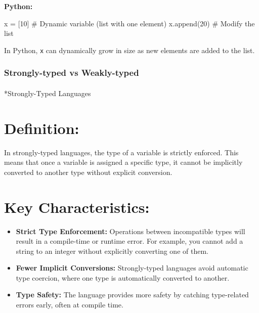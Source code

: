 \documentclass[
  letterpaper,
  DIV=11,
  numbers=noendperiod]{scrreprt}
\makeatletter
\let\oldparagraph\paragraph
\renewcommand{\paragraph}{
    \@ifstar
      \xxxParagraphStar
      \xxxParagraphNoStar
  }
\newcommand{\xxxParagraphStar}[1]{\oldparagraph*{#1}\mbox{}}
\newcommand{\xxxParagraphNoStar}[1]{\oldparagraph{#1}\mbox{}}
\newenvironment{Shaded}{\begin{snugshade}}{\end{snugshade}}
\newcommand{\CommentTok}[1]{\textcolor[rgb]{0.37,0.37,0.37}{#1}}
\newcommand{\DecValTok}[1]{\textcolor[rgb]{0.68,0.00,0.00}{#1}}
\newcommand{\FunctionTok}[1]{\textcolor[rgb]{0.28,0.35,0.67}{#1}}
\newcommand{\NormalTok}[1]{\textcolor[rgb]{0.00,0.23,0.31}{#1}}
\newcommand{\OtherTok}[1]{\textcolor[rgb]{0.00,0.23,0.31}{#1}}
\providecommand{\tightlist}{%
  \setlength{\itemsep}{0pt}\setlength{\parskip}{0pt}}
\makeatother
\begin{document}
\begin{tcolorbox}[enhanced jigsaw, colframe=quarto-callout-note-color-frame, toprule=.15mm, bottomrule=.15mm, rightrule=.15mm, colback=white, breakable, arc=.35mm, opacityback=0, left=2mm, leftrule=.75mm]
\textbf{Python:}

\begin{Shaded}
\begin{Highlighting}[]
\NormalTok{x }\OtherTok{=}\NormalTok{ [}\DecValTok{10}\NormalTok{]  }\CommentTok{\# Dynamic variable (list with one element)}
\FunctionTok{x.append}\NormalTok{(}\DecValTok{20}\NormalTok{)  }\CommentTok{\# Modify the list}
\end{Highlighting}
\end{Shaded}

In Python, \texttt{x} can dynamically grow in size as new elements are
added to the list.

\end{tcolorbox}

\subsubsection*{Strongly-typed vs
Weakly-typed}\label{strongly-typed-vs-weakly-typed}

\paragraph*{Strongly-Typed Languages}\label{strongly-typed-languages}

\section{Definition:}

In strongly-typed languages, the type of a variable is strictly
enforced. This means that once a variable is assigned a specific type,
it cannot be implicitly converted to another type without explicit
conversion.

\section{Key Characteristics:}

\begin{itemize}
\tightlist
\item
  \textbf{Strict Type Enforcement:} Operations between incompatible
  types will result in a compile-time or runtime error. For example, you
  cannot add a string to an integer without explicitly converting one of
  them.
\item
  \textbf{Fewer Implicit Conversions:} Strongly-typed languages avoid
  automatic type coercion, where one type is automatically converted to
  another.
\item
  \textbf{Type Safety:} The language provides more safety by catching
  type-related errors early, often at compile time.
\end{itemize}
\end{document}
